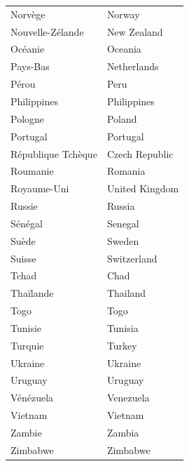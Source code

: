 \documentclass[12pt,a4paper]{article}
\begin{document}
\begin{longtable}{p{4cm} p{6cm}}
Norvège & Norway \\
Nouvelle-Zélande & New Zealand \\
Océanie & Oceania \\
Pays-Bas & Netherlands \\
Pérou & Peru \\
Philippines & Philippines \\
Pologne & Poland \\
Portugal & Portugal \\
République Tchèque & Czech Republic \\
Roumanie & Romania \\
Royaume-Uni & United Kingdom \\
Russie & Russia \\
Sénégal & Senegal \\
Suède & Sweden \\
Suisse & Switzerland \\
Tchad & Chad \\
Thaïlande & Thailand \\
Togo & Togo \\
Tunisie & Tunisia \\
Turquie & Turkey \\
Ukraine & Ukraine \\
Uruguay & Uruguay \\
Vénézuela & Venezuela \\
Vietnam & Vietnam \\
Zambie & Zambia \\
Zimbabwe & Zimbabwe \\
\bottomrule
\end{longtable}

\newpage
\end{document}
